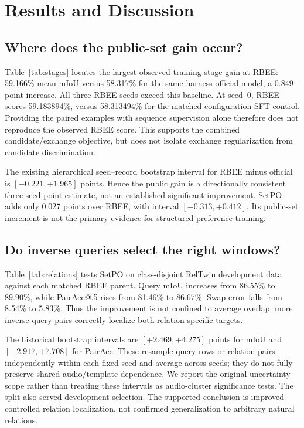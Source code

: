 \section{Results and Discussion}
\subsection{Where does the public-set gain occur?}
Table~\ref{tab:stages} locates the largest observed training-stage gain at RBEE: 59.166\% mean mIoU versus 58.317\% for the same-harness official model, a 0.849-point increase. All three RBEE seeds exceed this baseline. At seed~0, RBEE scores 59.183894\%, versus 58.313494\% for the matched-configuration SFT control. Providing the paired examples with sequence supervision alone therefore does not reproduce the observed RBEE score. This supports the combined candidate/exchange objective, but does not isolate exchange regularization from candidate discrimination.

The existing hierarchical seed--record bootstrap interval for RBEE minus official is $[-0.221,+1.965]$ points. Hence the public gain is a directionally consistent three-seed point estimate, not an established significant improvement. SetPO adds only 0.027 points over RBEE, with interval $[-0.313,+0.412]$. Its public-set increment is not the primary evidence for structured preference training.

\subsection{Do inverse queries select the right windows?}
Table~\ref{tab:relations} tests SetPO on class-disjoint RelTwin development data against each matched RBEE parent. Query mIoU increases from 86.55\% to 89.90\%, while PairAcc@.5 rises from 81.46\% to 86.67\%. Swap error falls from 8.54\% to 5.83\%. Thus the improvement is not confined to average overlap: more inverse-query pairs correctly localize both relation-specific targets.

The historical bootstrap intervals are $[+2.469,+4.275]$ points for mIoU and $[+2.917,+7.708]$ for PairAcc. These resample query rows or relation pairs independently within each fixed seed and average across seeds; they do not fully preserve shared-audio/template dependence. We report the original uncertainty scope rather than treating these intervals as audio-cluster significance tests. The split also served development selection. The supported conclusion is improved controlled relation localization, not confirmed generalization to arbitrary natural relations.

